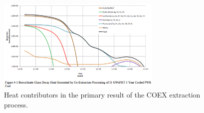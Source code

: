 \begin{figure}[htbp!]
  \begin{center}
    \includegraphics[width=0.7\textwidth]{./images/carter_coex_heat.eps}
  \end{center}
  \caption{Heat contributors in the primary result of the COEX extraction 
    process\cite{carter_us_2011}.}
  \label{fig:carter_coex_heat}
\end{figure}
